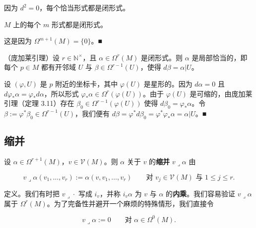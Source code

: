 \begin{examplenote}

\begin{items}
\item

因为 $ d^{2} = 0 $，每个恰当形式都是闭形式。

\item

$ M $ 上的每个 $ m $ 形式都是闭形式。

\proofhead
这是因为 $ \Omega^{m+1}(M) = \{0\} $。\nobreak\hspace{0.35em}■
\item

（庞加莱引理）设 $ r\in\mathbb{N}^{\times} $，且 $ \alpha\in\Omega^{r}(M) $ 是闭形式。则 $ \alpha $ 是局部恰当的，即每个 $ p\in M $ 都有开邻域 $ U $ 与 $ \beta\in\Omega^{r-1}(U) $，使得 $ d\beta = \alpha|U $。

\proofhead
设 $ (\varphi, U) $ 是 $ p $ 附近的坐标卡，其中 $ \varphi(U) $ 是星形的。因为 $ d\alpha = 0 $ 且 $ d\varphi_{\ast}\alpha = \varphi_{\ast}d\alpha $，所以形式 $ \varphi_{\ast}\alpha\in\Omega^{r}(\varphi(U)) $。由于 $ \varphi(U) $ 是可缩的，由庞加莱引理（定理 3.11）存在 $ \beta_{0}\in\Omega^{r-1}(\varphi(U)) $ 使得 $ d\beta_{0} = \varphi_{\ast}\alpha $。令 $ \beta := \varphi^{\ast}\beta_{0}\in\Omega^{r-1}(U) $，我们便有 $ d\beta = \varphi^{\ast}d\beta_{0} = \varphi^{\ast}\varphi_{\ast}\alpha = \alpha|U $。\nobreak\hspace{0.35em}■
\end{items}

\end{examplenote}

\subsection*{缩并}

设 $ \alpha\in\Omega^{r+1}(M) $，$ v\in\mathcal{V}(M) $。则 $ \alpha $ 关于 $ v $ 的\textbf{缩并} $ v\lrcorner\alpha $ 由

\[
v\lrcorner\alpha(v_{1}, \ldots, v_{r}) := \alpha(v, v_{1}, \ldots, v_{r}) \qquad \text{对 } v_{j}\in\mathcal{V}(M) \text{ 与 } 1\le j\le r .
\]

定义。我们有时把 $ v\lrcorner\cdot $ 写成 $ i_{v} $，并称 $ i_{v}\alpha $ 为 $ v $ 与 $ \alpha $ 的\textbf{内乘}。我们容易验证 $ v\lrcorner\alpha $ 属于 $ \Omega^{r}(M) $。为了完备性并避开一个麻烦的特殊情形，我们直接令

\[
v\lrcorner\alpha := 0 \qquad \text{对 } \alpha\in\Omega^{0}(M) .
\]

